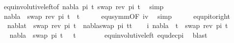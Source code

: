 \begin{isabellebody}
\ equ{\isacharunderscore}{\kern0pt}involutive{\isacharunderscore}{\kern0pt}left{\isacharbrackleft}{\kern0pt}of\ nabla\ pi\ t{}\ {\isacartoucheopen}swap\ {\isacharparenleft}{\kern0pt}rev\ pi{\isacharparenright}{\kern0pt}\ t{}{\isacartoucheclose}{\isacharbrackright}{\kern0pt}\ \isamarkupfalse%
\ simp\isanewline
\ \ \isamarkupfalse%
\ \isamarkupfalse%
\ {\isachardoublequoteopen}nabla\ {\isasymturnstile}\ swap\ {\isacharparenleft}{\kern0pt}rev\ pi{\isacharparenright}{\kern0pt}\ t{}\ {\isasymapprox}\ t{}{\isachardoublequoteclose}\isanewline
\ \ \ \ \isamarkupfalse%
\ equ{\isacharunderscore}{\kern0pt}symm{\isacharbrackleft}{\kern0pt}OF\ iv{\isacharbrackright}{\kern0pt}\ \isamarkupfalse%
\ simp\isacommand{{\isacharbraceright}{\kern0pt}}\isamarkupfalse%
\isanewline
\isanewline
{}\isamarkupfalse%
%
\endisatagproof
{\isafoldproof}%
%
\isadelimproof
\isanewline
%
\endisadelimproof
\ \ \ \ \isanewline
\isanewline
{}\isamarkupfalse%
\ equ{\isacharunderscore}{\kern0pt}pi{\isacharunderscore}{\kern0pt}to{\isacharunderscore}{\kern0pt}right{\isacharcolon}{\kern0pt}\ \isanewline
\ \ {\isachardoublequoteopen}nabla{\isasymturnstile}t{}\ {\isasymapprox}\ swap\ {\isacharparenleft}{\kern0pt}rev\ pi{\isacharparenright}{\kern0pt}\ t{}\ {\isacharequal}{\kern0pt}\ nabla{\isasymturnstile}swap\ pi\ t{}{\isasymapprox}t{}{\isachardoublequoteclose}\isanewline
%
\isadelimproof
%
\endisadelimproof
%
\isatagproof
{}\isamarkupfalse%
\isanewline
\ \ \isacommand{{\isacharbraceleft}{\kern0pt}}\isamarkupfalse%
\isamarkupfalse%
\ i{\isacharcolon}{\kern0pt}\ {\isachardoublequoteopen}nabla\ {\isasymturnstile}\ t{}\ {\isasymapprox}\ swap\ {\isacharparenleft}{\kern0pt}rev\ pi{\isacharparenright}{\kern0pt}\ t{}{\isachardoublequoteclose}\isanewline
\ \ \ \ \isamarkupfalse%
\ \isamarkupfalse%
\ {\isachardoublequoteopen}nabla\ {\isasymturnstile}\ swap\ pi\ t{}\ {\isasymapprox}\ \ t{}{\isachardoublequoteclose}\isanewline
\ \ \ \ \ \ \isamarkupfalse%
\ equ{\isacharunderscore}{\kern0pt}involutive{\isacharunderscore}{\kern0pt}left\ equ{\isacharunderscore}{\kern0pt}dec{\isacharunderscore}{\kern0pt}pi\ \isamarkupfalse%
\ blast\isacommand{{\isacharbraceright}{\kern0pt}}\isamarkupfalse%
\isanewline
\ \ \isacommand{{\isacharbraceleft}{\kern0pt}}\isamarkupfalse%

\end{isabellebody}
